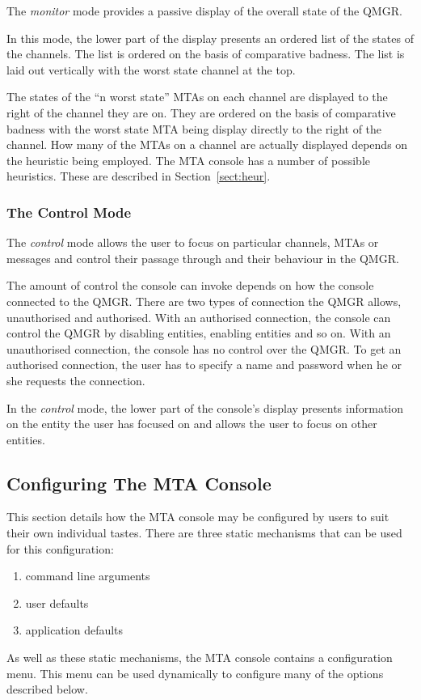 The {\em monitor} mode provides a passive display of the overall state
of the QMGR.

In this mode, the lower part of the display presents an ordered list
of the states of the channels.
The list is ordered on the basis of comparative badness.
The list is laid out vertically with the
worst state channel at the top.

The states of the ``n worst state'' MTAs on each channel are displayed
to the right of the channel they are on.
They are ordered on the basis of comparative badness with the worst
state MTA being display directly to the right of the channel.
How many of the MTAs on a channel are actually displayed depends on
the heuristic being employed.
The MTA console has a number of possible heuristics.
These are described in Section~\ref{sect:heur}.

\subsubsection	{The Control Mode}

The {\em control} mode allows the user to focus on particular
channels, MTAs or messages and control their passage through and their
behaviour in the QMGR.

The amount of control the console can invoke depends on how the
console connected to the QMGR.
There are two types of connection the QMGR allows, unauthorised
and authorised.
With an authorised connection, the console can control the QMGR
by disabling entities, enabling entities and so on.
With an unauthorised connection, the console has no control over the
QMGR.
To get an authorised connection, the user has to specify a name and
password when he or she requests the connection.

In the {\em control} mode, the lower part of the console's display presents
information on the entity the user has focused on and allows the user
to focus on other entities.

\subsection	{Configuring The MTA Console}

This section details how the MTA console may be 
configured by users to suit their own individual tastes.
There are three static mechanisms that can be used for this configuration:
\begin{enumerate}
\item command line arguments
\item user defaults
\item application defaults
\end{enumerate}
As well as these static mechanisms, the MTA console contains a
configuration menu.
This menu can be used dynamically to configure many of the options
described below.

